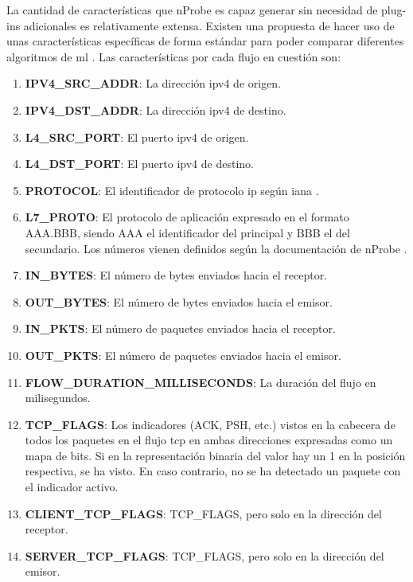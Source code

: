 La cantidad de características que nProbe es capaz generar sin necesidad de plug-ins adicionales es relativamente extensa. Existen una propuesta de hacer uso de unas características específicas de forma estándar para poder comparar diferentes algoritmos de \acrshort{ml} \cite{DBLP:journals/corr/abs-2101-11315}. Las características por cada flujo en cuestión son:

\begin{enumerate}
    \item \textbf{IPV4\_SRC\_ADDR}: La dirección \acrshort{ipv4} de origen.
    \item \textbf{IPV4\_DST\_ADDR}: La dirección \acrshort{ipv4} de destino.
    \item \textbf{L4\_SRC\_PORT}: El puerto \acrshort{ipv4} de origen.
    \item \textbf{L4\_DST\_PORT}: El puerto \acrshort{ipv4} de destino.
    \item \textbf{PROTOCOL}: El identificador de protocolo \acrshort{ip} según \acrshort{iana} \cite{ipprotocolnumbers}.
    \item \textbf{L7\_PROTO}: El protocolo de aplicación expresado en el formato AAA.BBB, siendo AAA el identificador del principal y BBB el del secundario. Los números vienen definidos según la documentación de nProbe \cite{nprobe_documentation_proto_app}.
    \item \textbf{IN\_BYTES}: El número de bytes enviados hacia el receptor.
    \item \textbf{OUT\_BYTES}: El número de bytes enviados hacia el emisor.
    \item \textbf{IN\_PKTS}: El número de paquetes enviados hacia el receptor.
    \item \textbf{OUT\_PKTS}: El número de paquetes enviados hacia el emisor.
    \item \textbf{FLOW\_DURATION\_MILLISECONDS}: La duración del flujo en milisegundos.
    \item \textbf{TCP\_FLAGS}: Los indicadores (ACK, PSH, etc.) vistos en la cabecera de todos los paquetes en el flujo \acrshort{tcp} en ambas direcciones expresadas como un mapa de bits. Si en la representación binaria del valor hay un 1 en la posición respectiva, se ha visto. En caso contrario, no se ha detectado un paquete con el indicador activo.
    \item \textbf{CLIENT\_TCP\_FLAGS}: TCP\_FLAGS, pero solo en la dirección del receptor.
    \item \textbf{SERVER\_TCP\_FLAGS}: TCP\_FLAGS, pero solo en la dirección del emisor.

\end{enumerate}
